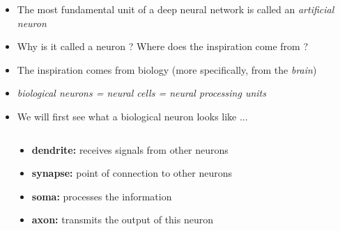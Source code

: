 \documentclass[serif, aspectratio=169]{beamer}
\begin{document}
\begin{frame}
\begin{columns}
  \begin{overlayarea}{\textwidth}{\textheight}

  \begin{itemize}
    \justifying
    \item<1-> The most fundamental unit of a deep neural network is called an \textit{artificial neuron}
    \item<2-> Why is it called a neuron ? Where does the inspiration come from ?
    \item<3-> The inspiration comes from biology (more specifically, from the \textit{brain})
    \item<4-> \textit{biological neurons = neural cells = neural processing units}
    \item<5-> We will first see what a biological neuron looks like ...

  \end{itemize}
  \end{overlayarea}
  \end{columns}
  \end{frame}


  \begin{frame}
  \begin{columns}

  \begin{overlayarea}{\textwidth}{\textheight}


  \end{overlayarea}

  \begin{overlayarea}{\textwidth}{\textheight}
  \begin{itemize}\justifying
  \item<2-> \textbf{dendrite:}  receives signals from other neurons
  \item<3-> \textbf{synapse:}  point of connection to other neurons
  \item<4-> \textbf{soma:}  processes the information
  \item<5-> \textbf{axon:}  transmits the output of this neuron
\end{itemize}
\end{overlayarea}
\end{columns}
\end{frame}
\end{document}

